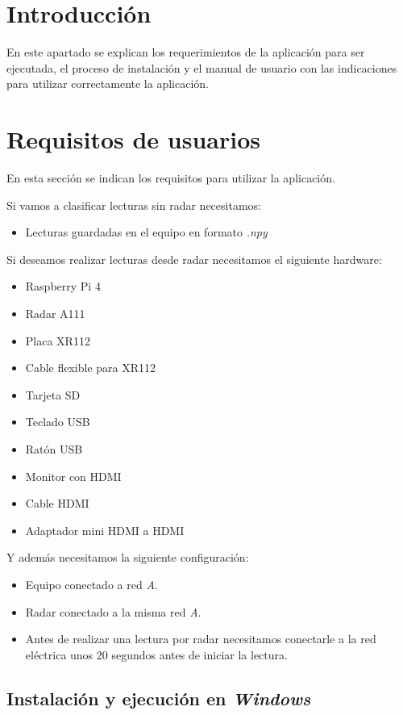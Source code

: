 
\section{Introducción}

En este apartado se explican los requerimientos de la aplicación para ser ejecutada, el proceso de instalación y el manual de usuario con las indicaciones para utilizar correctamente la aplicación.

\section{Requisitos de usuarios}

En esta sección se indican los requisitos para utilizar la aplicación.

Si vamos a clasificar lecturas sin radar necesitamos:
\begin{itemize}
\item Lecturas guardadas en el equipo en formato \textit{.npy}
\end{itemize}

Si deseamos realizar lecturas desde radar necesitamos el siguiente hardware:
\begin{itemize}
\item Raspberry Pi 4
\item Radar A111
\item Placa XR112
\item Cable flexible para XR112
\item Tarjeta SD
\item Teclado USB
\item Ratón USB
\item Monitor con HDMI
\item Cable HDMI
\item Adaptador mini HDMI a HDMI
\end{itemize}

Y además necesitamos la siguiente configuración:
\begin{itemize}
\item Equipo conectado a red \textit{A}.
\item Radar conectado a la misma red \textit{A}.
\item Antes de realizar una lectura por radar necesitamos conectarle a la red eléctrica unos 20 segundos antes de iniciar la lectura.
\end{itemize}

\subsection{Instalación y ejecución en \textit{Windows}}

